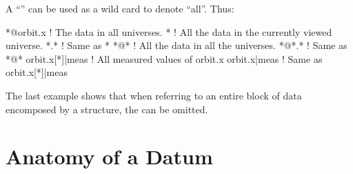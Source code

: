 A ``\vn{*}'' can be used as a wild card to denote ``all''. Thus:
\begin{example}
  *@orbit.x       ! The  data in all universes.
  *               ! All the data in the currently viewed universe.
  *.*             ! Same as *
  *@*             ! All the data in all the universes. 
  *@*.*           ! Same as *@*
  orbit.x[*]|meas ! All measured values of orbit.x
  orbit.x|meas    ! Same as orbit.x[*]|meas
\end{example}
The last example shows that when referring to an entire block of data
encomposed by a  structure, the \vn{[*]} can be omitted.

\section{Anatomy of a Datum}
\label{s:data-anatomy}

